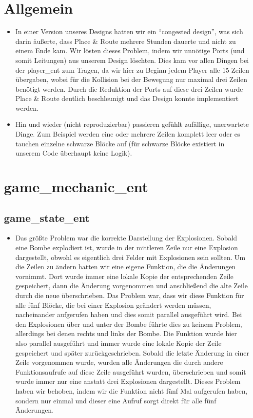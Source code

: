 \documentclass[parskip=full]{scrartcl}
\begin{document}
		\section{Allgemein}
			\begin{itemize}
				\item In einer Version unseres Designs hatten wir ein \enquote{congested design}, was sich darin äußerte, dass Place \& Route mehrere Stunden dauerte und nicht zu einem Ende kam. Wir lösten dieses Problem, indem wir unnötige Ports (und somit Leitungen) aus unserem Design löschten. Dies kam vor allen Dingen bei der player\_ent zum Tragen, da wir hier zu Beginn jedem Player alle 15 Zeilen übergaben, wobei für die Kollision bei der Bewegung nur maximal drei Zeilen benötigt werden. Durch die Reduktion der Ports auf diese drei Zeilen wurde Place \& Route deutlich beschleunigt und das Design konnte implementiert werden.
				\item Hin und wieder (nicht reproduzierbar) passieren gefühlt zufällige, unerwartete Dinge. Zum Beispiel werden eine oder mehrere Zeilen komplett leer oder es tauchen einzelne schwarze Blöcke auf (für schwarze Blöcke existiert in unserem Code überhaupt keine Logik).
			\end{itemize}

		\section{game\_mechanic\_ent}

			\subsection{game\_state\_ent}
				\begin{itemize}
					\item Das größte Problem war die korrekte Darstellung der Explosionen. Sobald eine Bombe explodiert ist, wurde in der mittleren Zeile nur eine Explosion dargestellt, obwohl es eigentlich drei Felder mit Explosionen sein sollten. Um die Zeilen zu ändern hatten wir eine eigene Funktion, die die Änderungen vornimmt. Dort wurde immer eine lokale Kopie der entsprechenden Zeile gespeichert, dann die Änderung vorgenommen und anschließend die alte Zeile durch die neue überschrieben. Das Problem war, dass wir diese Funktion für alle fünf Blöcke, die bei einer Explosion geändert werden müssen, nacheinander aufgerufen haben und dies somit parallel ausgeführt wird. Bei den Explosionen über und unter der Bombe führte dies zu keinem Problem, allerdings bei denen rechts und links der Bombe. Die Funktion wurde hier also parallel ausgeführt und immer wurde eine lokale Kopie der Zeile gespeichert und später zurückgeschrieben. Sobald die letzte Änderung in einer Zeile vorgenommen wurde, wurden alle Änderungen die durch andere Funktionsaufrufe auf diese Zeile ausgeführt wurden, überschrieben und somit wurde immer nur eine anstatt drei Explosionen dargestellt. Dieses Problem haben wir behoben, indem wir die Funktion nicht fünf Mal aufgerufen haben, sondern nur einmal und dieser eine Aufruf sorgt direkt für alle fünf Änderungen.
				\end{itemize}
\end{document}
